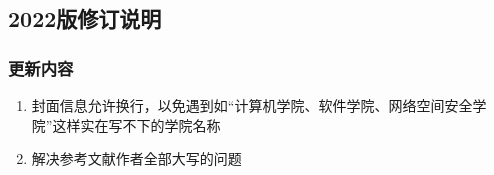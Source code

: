 \subsection{2022版修订说明}

\subsubsection{更新内容}

\begin{enumerate}[1、]
    \item 封面信息允许换行，以免遇到如“计算机学院、软件学院、网络空间安全学院”这样实在写不下的学院名称
    \item 解决参考文献作者全部大写的问题
\end{enumerate}
